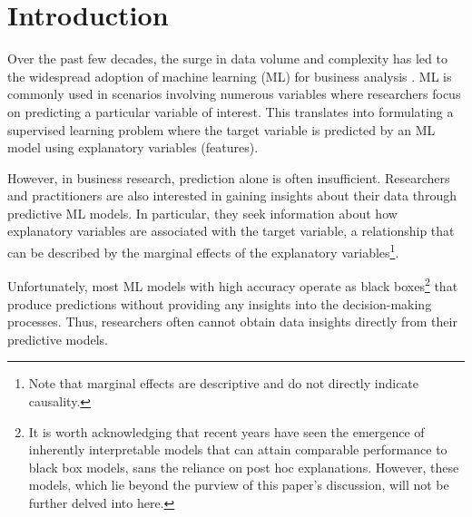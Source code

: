 \documentclass[mnsc,blindrev]{informs3}
\begin{document}
\maketitle

\section{Introduction}

Over the past few decades, the surge in data volume and complexity has led to the widespread adoption of machine learning (ML) for business analysis \citep{kleinberg2015prediction,mullainathan17applied}. ML is commonly used in scenarios involving numerous variables where researchers focus on predicting a particular variable of interest. This translates into formulating a supervised learning problem where the target variable is predicted by an ML model using explanatory variables (features).

However, in business research, prediction alone is often insufficient. Researchers and practitioners are also interested in gaining insights about their data through predictive ML models. In particular, they seek information about how explanatory variables are associated with the target variable, a relationship that can be described by the marginal effects of the explanatory variables\footnote{Note that marginal effects are descriptive and do not directly indicate causality.}. 

Unfortunately, most ML models with high accuracy operate as black boxes\footnote{It is worth acknowledging that recent years have seen the emergence of inherently interpretable models that can attain comparable performance to black box models, sans the reliance on post hoc explanations. However, these models, which lie beyond the purview of this paper's discussion, will not be further delved into here.} that produce predictions without providing any insights into the decision-making processes. Thus, researchers often cannot obtain data insights directly from their predictive models.
\end{document}
